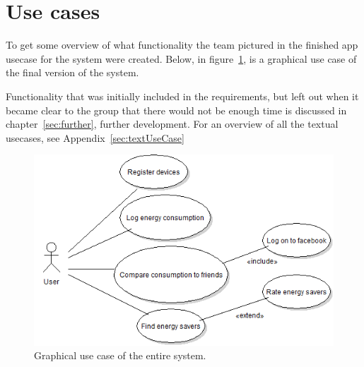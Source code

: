 \section{Use cases}
To get some overview of what functionality the team pictured in the finished app \gls{usecase} for the system were created. Below, in figure~\ref{fig:usecase}, is a graphical use case of the final version of the system.

Functionality that was initially included in the requirements, but left out when it became clear to the group that there would not be enough time is discussed in chapter~\ref{sec:further}, further development. For an overview of all the textual usecases, see Appendix~\ref{sec:textUseCase} \newline

\begin{figure}[H]
\includegraphics[width=\textwidth]{ch/specification/fig/currentUsecase.png}
\caption{Graphical use case of the entire system.}
\label{fig:usecase}
\end{figure}
